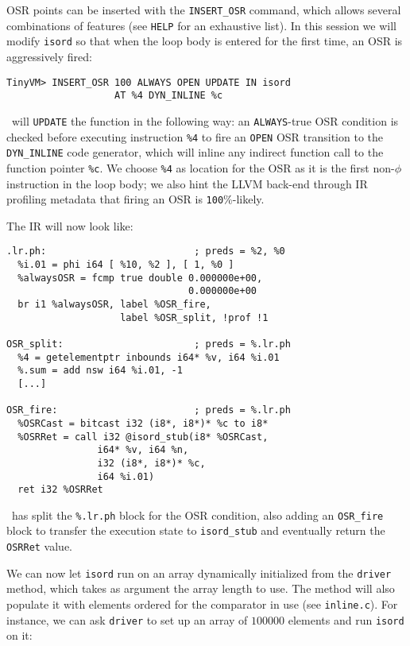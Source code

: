 OSR points can be inserted with the {\tt INSERT\_OSR} command, which allows several combinations of features (see {\tt HELP} for an exhaustive list). In this session we will modify {\tt isord} so that when the loop body is entered for the first time, an OSR is aggressively fired:

\begin{small}
\begin{verbatim}
TinyVM> INSERT_OSR 100 ALWAYS OPEN UPDATE IN isord
                   AT %4 DYN_INLINE %c
\end{verbatim}
\end{small}

\noindent \tinyvm\ will {\tt UPDATE} the function in the following way: an {\tt ALWAYS}-true OSR condition is checked before executing instruction {\tt \%4} to fire an {\tt OPEN} OSR transition to the {\tt DYN\_INLINE} code generator, which will inline any indirect function call to the function pointer {\tt \%c}. We choose {\tt \%4} as location for the OSR as it is the first non-$\phi$ instruction in the loop body; we also hint the LLVM back-end through IR profiling metadata that firing an OSR is {\tt 100}\%-likely.

The IR will now look like:

\begin{small}
\begin{verbatim}
.lr.ph:                          ; preds = %2, %0
  %i.01 = phi i64 [ %10, %2 ], [ 1, %0 ]
  %alwaysOSR = fcmp true double 0.000000e+00,
                                0.000000e+00
  br i1 %alwaysOSR, label %OSR_fire,
                    label %OSR_split, !prof !1

OSR_split:                       ; preds = %.lr.ph
  %4 = getelementptr inbounds i64* %v, i64 %i.01
  %.sum = add nsw i64 %i.01, -1
  [...]

OSR_fire:                        ; preds = %.lr.ph
  %OSRCast = bitcast i32 (i8*, i8*)* %c to i8*
  %OSRRet = call i32 @isord_stub(i8* %OSRCast,
                i64* %v, i64 %n,
                i32 (i8*, i8*)* %c,
                i64 %i.01)
  ret i32 %OSRRet
\end{verbatim}
\end{small}

\noindent\osrkit\ has split the {\tt \%.lr.ph} block for the OSR condition, also adding an {\tt OSR\_fire} block to transfer the execution state to {\tt isord\_stub} and eventually return the {\tt OSRRet} value. 

We can now let {\tt isord} run on an array dynamically initialized from the {\tt driver} method, which takes as argument the array length to use. The method will also populate it with elements ordered for the comparator in use (see {\small\tt inline.c}). For instance, we can ask {\tt driver} to set up an array of $100000$ elements and run {\tt isord} on it:

